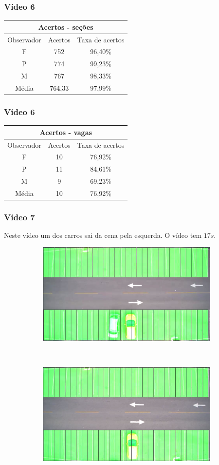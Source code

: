 \documentclass{beamer}
\begin{document}
\begin{frame}
	\frametitle{Vídeo 6}
\begin{center}
\begin{tabular}{|c||c||c|}
\hline
\multicolumn{3}{|c|}{Acertos - seções}  \\ \hline
Observador & Acertos & Taxa de acertos \\ \hline
F & 752 & 96,40\% \\  \hline
P & 774 & 99,23\% \\ \hline
M & 767 & 98,33\% \\ \hline
Média & 764,33 & 97,99\% \\
\hline
\end{tabular}
\end{center}
\end{frame}

\begin{frame}
\frametitle{Vídeo 6}

\begin{center}
\begin{tabular}{|c||c||c|}
\hline
\multicolumn{3}{|c|}{Acertos - vagas}  \\ \hline \hline
Observador & Acertos & Taxa de acertos \\ \hline
F & 10 & 76,92\% \\  \hline
P & 11 & 84,61\% \\ \hline
M & 9 & 69,23\% \\ \hline
Média & 10 & 76,92\% \\
\hline
\end{tabular}
\end{center}
\end{frame}


\begin{frame}
\frametitle{Vídeo 7}
Neste vídeo um dos carros sai da cena pela esquerda. O vídeo tem $17s$.

\begin{figure}
\centering
\begin{subfigure}{.5\textwidth}
\centering
\includegraphics[width=.5\linewidth]{Video7Inicio}
\end{subfigure}\
\begin{subfigure}{.5\textwidth}
\centering
\includegraphics[width=.5\linewidth]{Video7Fim}
\end{subfigure}
\centering
\end{figure}	
\end{frame}
\end{document}
